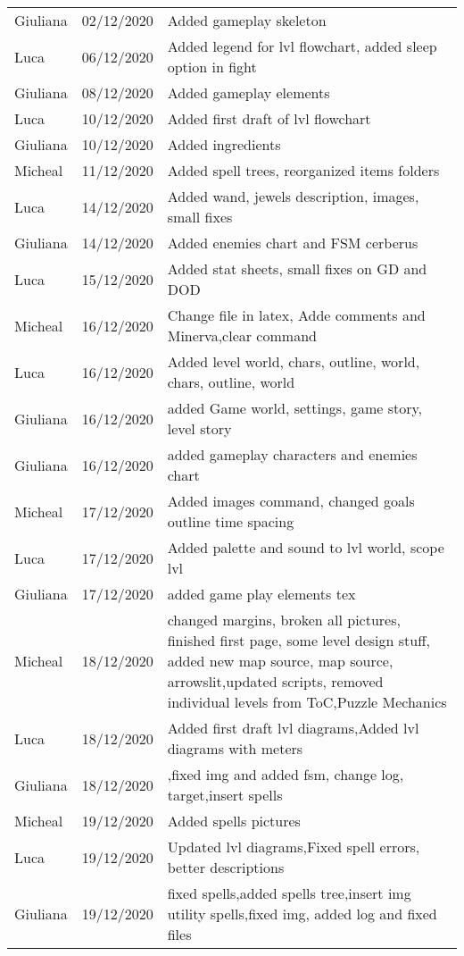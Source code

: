 \begin{longtable}{ m{2cm}m{3cm}m{8cm}}
Giuliana & 02/12/2020 &  Added gameplay skeleton\\
Luca & 06/12/2020 & Added legend for lvl flowchart, added sleep option in fight \\
Giuliana & 08/12/2020 & Added gameplay elements\\
Luca & 10/12/2020 & Added first draft of lvl flowchart\\
Giuliana & 10/12/2020 & Added ingredients\\
Micheal & 11/12/2020 & Added spell trees, reorganized items folders\\
Luca & 14/12/2020 &Added wand, jewels description, images, small fixes \\
Giuliana & 14/12/2020 & Added enemies chart and FSM cerberus\\
Luca & 15/12/2020 &  Added stat sheets, small fixes on GD and DOD\\
Micheal & 16/12/2020 & Change file in latex, Adde comments and Minerva,clear command \\
Luca & 16/12/2020 & Added level world, chars, outline, world, chars, outline, world\\
Giuliana & 16/12/2020 & added Game world, settings, game story, level story\\
Giuliana & 16/12/2020 & added gameplay characters and enemies chart\\
Micheal & 17/12/2020 & Added images command, changed goals outline time spacing\\
Luca & 17/12/2020 & Added palette and sound to lvl world, scope lvl\\
Giuliana & 17/12/2020 & added game play elements tex\\
Micheal & 18/12/2020 & changed margins, broken all pictures, finished first page, some level design stuff, added new map source, map source, arrowslit,updated scripts, removed individual levels from ToC,Puzzle Mechanics\\
Luca & 18/12/2020 & Added first draft lvl diagrams,Added lvl diagrams with meters\\
Giuliana & 18/12/2020 & ,fixed img and added fsm, change log, target,insert spells\\
Micheal & 19/12/2020 & Added spells pictures\\
Luca & 19/12/2020 & Updated lvl diagrams,Fixed spell errors, better descriptions\\
Giuliana & 19/12/2020 & fixed spells,added spells tree,insert img utility spells,fixed img, added log and fixed files\\



\end{longtable}

\pagebreak

